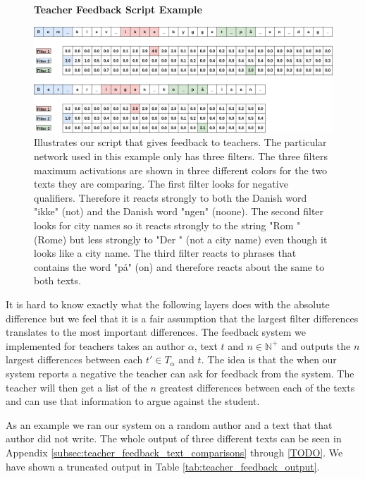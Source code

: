 \begin{figure}
    \centering
    \textbf{Teacher Feedback Script Example}\par\medskip
    \includegraphics[width=\textwidth]{./pictures/discussion/teacher_feedback_example.png}
    \caption{Illustrates our script that gives feedback to teachers. The
        particular network used in this example only has three filters. The
        three filters maximum activations are shown in three different colors
        for the two texts they are comparing. The first filter looks for
        negative qualifiers. Therefore it reacts strongly to both the Danish
        word "ikke" (not) and the Danish word "ngen" (noone). The second filter
        looks for city names so it reacts strongly to the string "Rom " (Rome)
        but less strongly to "Der " (not a city name) even though it looks like
        a city name. The third filter reacts to phrases that contains the word
        "p\aa " (on) and therefore reacts about the same to both texts.}
    \label{fig:feature_extraction_output_example}
\end{figure}

It is hard to know exactly what the following layers does with the absolute
difference but we feel that it is a fair assumption that the largest filter
differences translates to the most important differences. The feedback system
we implemented for teachers takes an author $\alpha$, text $t$ and $n \in
\mathbb{N}^+$ and outputs the $n$ largest differences between each $t' \in
T_\alpha$ and $t$. The idea is that the when our system reports a negative the
teacher can ask for feedback from the system. The teacher will then get a list
of the $n$ greatest differences between each of the texts and can use that
information to argue against the student.

As an example we ran our system on a random author and a text that that author
did not write. The whole output of three different texts can be seen in Appendix
\ref{subsec:teacher_feedback_text_comparisons} through \ref{TODO}. We have shown
a truncated output in Table \ref{tab:teacher_feedback_output}.


